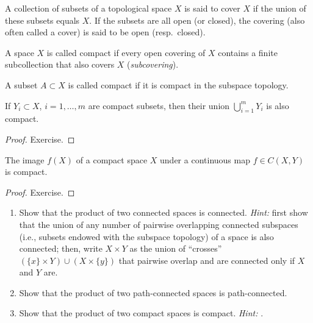 \begin{defn}
    A collection of subsets of a topological space $X$ is said to cover $X$ if the union of these subsets equals $X$. If the subsets are all open (or closed), the covering (also often called a cover) is said to be open (resp.~closed).
\end{defn}

\begin{defn}
    A space $X$ is called compact if every open covering of $X$ contains a finite subcollection that also covers $X$ (\emph{subcovering}).
\end{defn}

\begin{defn}
    A subset $A\subset X$ is called compact if it is compact in the subspace topology.
\end{defn}

\begin{prop}
    If $Y_i\subset X$, $i = 1,\dots, m$ are compact subsets, then their union $\bigcup_{i=1}^m Y_i$ is also compact.
\end{prop}
\begin{proof}
    Exercise.
\end{proof}

\begin{prop}\label{prop f(compact)=compact}
    The image $f(X)$ of a compact space $X$ under a continuous map $f\in C(X,Y)$ is compact.
\end{prop}
\begin{proof}
    Exercise.
\end{proof}

\begin{xca}
\begin{enumerate}
    \item Show that the product of two connected spaces is connected. \emph{Hint:} first show that the union of any number of pairwise overlapping connected subspaces (i.e., subsets endowed with the subspace topology) of a space is also connected; then, write $X\times Y$ as the union of ``crosses'' $(\{x\}\times Y)\cup (X\times \{y\})$ that pairwise overlap and are connected only if $X$ and $Y$ are.
    \item Show that the product of two path-connected spaces is path-connected.
    \item Show that the product of two compact spaces is compact. \emph{Hint:} \cite{compact.proof}.
\end{enumerate}
\end{xca}


